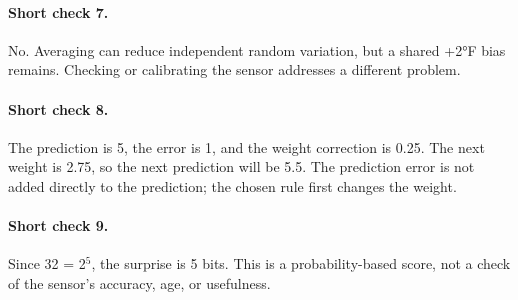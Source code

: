 \documentclass[11pt,letterpaper]{article}
\begin{document}
{\paragraph{Short check 7.}
No. Averaging can reduce independent random variation, but a shared +2°F bias remains. Checking or calibrating the sensor addresses a different problem.


\paragraph{Short check 8.}
The prediction is 5, the error is 1, and the weight correction is 0.25. The next weight is 2.75, so the next prediction will be 5.5. The prediction error is not added directly to the prediction; the chosen rule first changes the weight.


\paragraph{Short check 9.}
Since 32 = 2$^5$, the surprise is 5 bits. This is a probability-based score, not a check of the sensor's accuracy, age, or usefulness.


\clearpage

}
\end{document}
